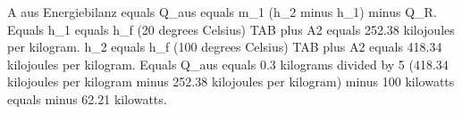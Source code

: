 A aus Energiebilanz equals Q_aus equals m_1 (h_2 minus h_1) minus Q_R.  
Equals h_1 equals h_f (20 degrees Celsius) TAB plus A2 equals 252.38 kilojoules per kilogram.  
h_2 equals h_f (100 degrees Celsius) TAB plus A2 equals 418.34 kilojoules per kilogram.  
Equals Q_aus equals 0.3 kilograms divided by 5 (418.34 kilojoules per kilogram minus 252.38 kilojoules per kilogram) minus 100 kilowatts equals minus 62.21 kilowatts.